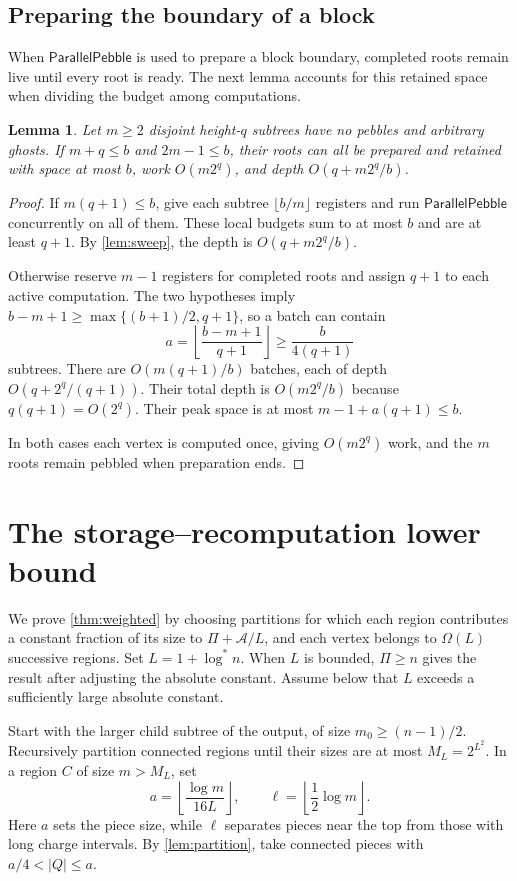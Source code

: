 \documentclass[11pt]{article}
\newtheorem{lemma}[lemma]{Lemma}
\theoremstyle{definition}
\theoremstyle{remark}
\newcommand{\Sweep}{\mathsf{ParallelPebble}}
\newcommand{\Area}{\mathcal A}
\begin{document}
\subsection{Preparing the boundary of a block}

When $\Sweep$ is used to prepare a block boundary, completed roots remain live until every root is ready. The next lemma accounts for this retained space when dividing the budget among computations.

\begin{lemma}
\label{lem:frontier}
Let $m\ge2$ disjoint height-$q$ subtrees have no pebbles and arbitrary ghosts. If $m+q\le b$ and $2m-1\le b$, their roots can all be prepared and retained with space at most $b$, work $O(m2^q)$, and depth $O(q+m2^q/b)$.
\end{lemma}
\begin{proof}
If $m(q+1)\le b$, give each subtree $\lfloor b/m\rfloor$ registers and run $\Sweep$ concurrently on all of them. These local budgets sum to at most $b$ and are at least $q+1$. By \cref{lem:sweep}, the depth is $O(q+m2^q/b)$.

Otherwise reserve $m-1$ registers for completed roots and assign $q+1$ to each active computation. The two hypotheses imply
$b-m+1\ge\max\{(b+1)/2,q+1\}$, so a batch can contain
\[
a=\left\lfloor\frac{b-m+1}{q+1}\right\rfloor\ge\frac{b}{4(q+1)}
\]
subtrees. There are $O(m(q+1)/b)$ batches, each of depth $O(q+2^q/(q+1))$. Their total depth is $O(m2^q/b)$ because $q(q+1)=O(2^q)$. Their peak space is at most $m-1+a(q+1)\le b$.

In both cases each vertex is computed once, giving $O(m2^q)$ work, and the $m$ roots remain pebbled when preparation ends.
\end{proof}

\section{The storage--recomputation lower bound}
\label{app:storage}

We prove \cref{thm:weighted} by choosing partitions for which each region contributes a constant fraction of its size to $\Pi+\Area/L$, and each vertex belongs to $\Omega(L)$ successive regions. Set $L=1+\log^*n$. When $L$ is bounded, $\Pi\ge n$ gives the result after adjusting the absolute constant. Assume below that $L$ exceeds a sufficiently large absolute constant.

Start with the larger child subtree of the output, of size $m_0\ge(n-1)/2$. Recursively partition connected regions until their sizes are at most $M_L=2^{L^2}$. In a region $C$ of size $m>M_L$, set
\[
a=\left\lfloor\frac{\log m}{16L}\right\rfloor, \qquad \ell=\left\lfloor\frac12\log m\right\rfloor.
\]
Here $a$ sets the piece size, while $\ell$ separates pieces near the top from those with long charge intervals. By \cref{lem:partition}, take connected pieces with $a/4<|Q|\le a$.
\end{document}
